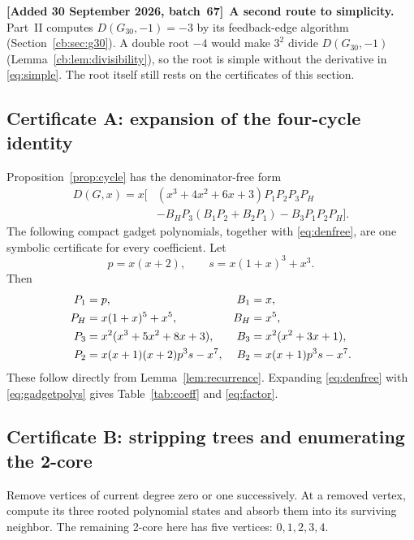 \documentclass[11pt]{article}
\numberwithin{equation}{section}
\theoremstyle{definition}
\newenvironment{writenote}[1][]{\par\smallskip\begingroup\small\sloppy
 \noindent\textbf{[Added 30 September 2026, batch~67]}\if\relax\detokenize{#1}\relax\else~\textbf{#1.}\fi\ }%
 {\par\endgroup\smallskip}
\newcommand{\D}{D}
\newcommand{\Gthirty}{G_{30}}
\begin{document}
\begin{writenote}[A second route to simplicity]
Part~II computes \(\D(\Gthirty,-1)=-3\) by its feedback-edge algorithm
(Section~\ref{cb:sec:g30}). A double root \(-4\) would make \(3^2\) divide
\(\D(\Gthirty,-1)\) (Lemma~\ref{cb:lem:divisibility}), so the root is
simple without the derivative in \eqref{eq:simple}. The root itself still
rests on the certificates of this section.
\end{writenote}

\subsection{Certificate A: expansion of the four-cycle identity}

Proposition~\ref{prop:cycle} has the denominator-free form
\begin{equation}\label{eq:denfree}
\begin{aligned}
\D(G,x)=x\bigl[&
 (x^3+4x^2+6x+3)P_1P_2P_3P_H\\
 &-B_HP_3(B_1P_2+B_2P_1)-B_3P_1P_2P_H\bigr].
\end{aligned}
\end{equation}
The following compact gadget polynomials, together with
\eqref{eq:denfree}, are one symbolic certificate for every coefficient.
Let
\[
 p=x(x+2),\qquad s=x(1+x)^3+x^3.
\]
Then
\begin{align}
 P_1&=p,& B_1&=x,\notag\\
 P_H&=x(1+x)^5+x^5,&B_H&=x^5,\notag\\
 P_3&=x^2(x^3+5x^2+8x+3),&B_3&=x^2(x^2+3x+1),\label{eq:gadgetpolys}\\
 P_2&=x(x+1)(x+2)p^3s-x^7,&
 B_2&=x(x+1)p^3s-x^7.\notag
\end{align}
These follow directly from Lemma~\ref{lem:recurrence}. Expanding
\eqref{eq:denfree} with \eqref{eq:gadgetpolys} gives
Table~\ref{tab:coeff} and \eqref{eq:factor}.

\subsection{Certificate B: stripping trees and enumerating the 2-core}

Remove vertices of current degree zero or one successively. At a
removed vertex, compute its three rooted polynomial states and absorb
them into its surviving neighbor. The remaining 2-core here has five
vertices: \(0,1,2,3,4\).
\end{document}
